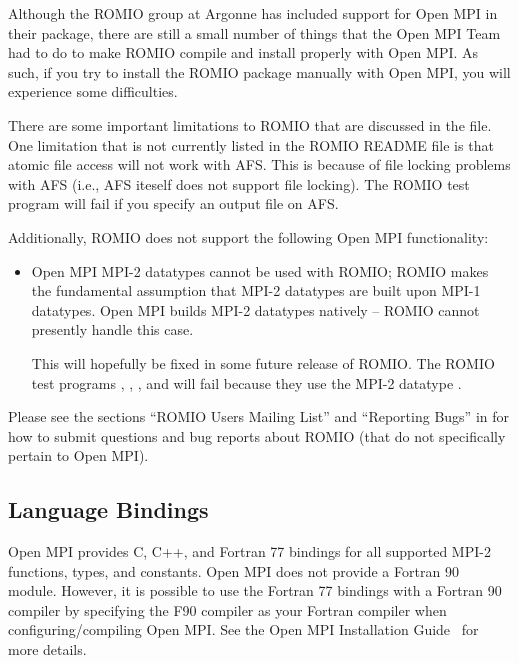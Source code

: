 Although the ROMIO group at Argonne has included support for Open MPI in
their package, there are still a small number of things that the Open MPI
Team had to do to make ROMIO compile and install properly with
Open MPI.  As such, if you try to install the ROMIO package manually
with Open MPI, you will experience some difficulties.

There are some important limitations to ROMIO that are discussed in
the  file.
%
One limitation that is not currently listed in the ROMIO README file
is that atomic file access will not work with AFS.  This is because of
file locking problems with AFS (i.e., AFS iteself does not support
file locking).  The ROMIO test program  will fail if
you specify an output file on AFS.

Additionally, ROMIO does not support the following Open MPI functionality:

\begin{itemize}
\item Open MPI MPI-2 datatypes cannot be used with ROMIO; ROMIO makes the
  fundamental assumption that MPI-2 datatypes are built upon MPI-1
  datatypes.  Open MPI builds MPI-2 datatypes natively -- ROMIO cannot
  presently handle this case.
  
  This will hopefully be fixed in some future release of ROMIO.  The
  ROMIO test programs , ,
  , and  will fail because they
  use the MPI-2 datatype .
\end{itemize}

Please see the sections ``ROMIO Users Mailing List'' and ``Reporting
Bugs'' in  for how to submit questions and bug
reports about ROMIO (that do not specifically pertain to Open MPI).


\subsection{Language Bindings}

Open MPI provides C, C++, and Fortran 77 bindings for all supported MPI-2
functions, types, and constants.  Open MPI does not provide a Fortran 90
module.
%
However, it is possible to use the Fortran 77 bindings with a Fortran
90 compiler by specifying the F90 compiler as your Fortran compiler
when configuring/compiling Open MPI.  See the Open MPI Installation
Guide~\cite{lamteam03:_lam_mpi_install_guide} for more details.

